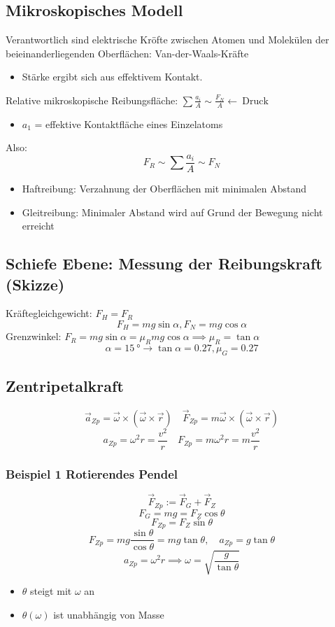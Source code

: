 \documentclass[a4paper]{scrartcl}
\renewcommand{\v}[1]{\vec{#1}}
\theoremstyle{definition}
\theoremstyle{plain}
\theoremstyle{plain}
\theoremstyle{remark}
\theoremstyle{remark}
\theoremstyle{remark}
\begin{document}
\subsection{Mikroskopisches Modell}
\label{sec-3-9}
Verantwortlich sind elektrische Kröfte zwischen Atomen und Molekülen der beieinanderliegenden Oberflächen: Van-der-Waals-Kräfte
\begin{itemize}
\item Stärke ergibt sich aus effektivem Kontakt.
\end{itemize}
Relative mikroskopische Reibungsfläche: $\sum \frac{a_i}{A} \sim \frac{F_N}{A} \leftarrow~\text{Druck}$
\begin{itemize}
\item $a_1$ = effektive Kontaktfläche eines Einzelatoms
\end{itemize}
Also: \[F_R \sim \sum \frac{a_i}{A} \sim F_N\]
\begin{itemize}
\item Haftreibung: Verzahnung der Oberflächen mit minimalen Abstand
\item Gleitreibung: Minimaler Abstand wird auf Grund der Bewegung nicht erreicht
\end{itemize}
\subsection{Schiefe Ebene: Messung der Reibungskraft (Skizze)}
\label{sec-3-10}
Kräftegleichgewicht: $F_H = F_R$
\[F_H = m g \sin{\alpha}, F_N = m g \cos{\alpha}\]
Grenzwinkel: $F_R = m g \sin{\alpha} = \mu_R m g \cos{\alpha} \implies \mu_R = \tan{\alpha}$
\[\alpha = \SI{15}{\degree} \rightarrow \tan{\alpha} = 0.27,\mu_G = 0.27\]
\subsection{Zentripetalkraft}
\label{sec-3-11}
\[\v a_{Zp} = \v \omega \times(\v\omega\times\v r)\quad \v{F}_{Zp} = m\v\omega\times(\v\omega\times\v r)\]
\[a_{Zp} = \omega^2 r = \frac{v^2}{r}\quad F_{Zp} = m\omega^2 r = m \frac{v^2}{r}\]
\subsubsection{Beispiel 1 Rotierendes Pendel}
\label{sec-3-11-1}
\[\v{F}_{Zp} := \v{F}_G + \v{F}_Z\]
\[F_G = m g = F_Z \cos{\theta}\]
\[F_{Zp} = F_Z \sin{\theta}\]
\[F_{Zp} = mg \frac{\sin{\theta}}{\cos{\theta}} = m g \tan{\theta},\quad a_{Zp} = g\tan{\theta}\]
\[a_{Zp} = \omega^2 r \implies \omega = \sqrt{\frac{g}{\tan{\theta}}}\]
\begin{itemize}
\item $\theta$ steigt mit $\omega$ an
\item $\theta(\omega)$ ist unabhängig von Masse
\end{itemize}
\end{document}

